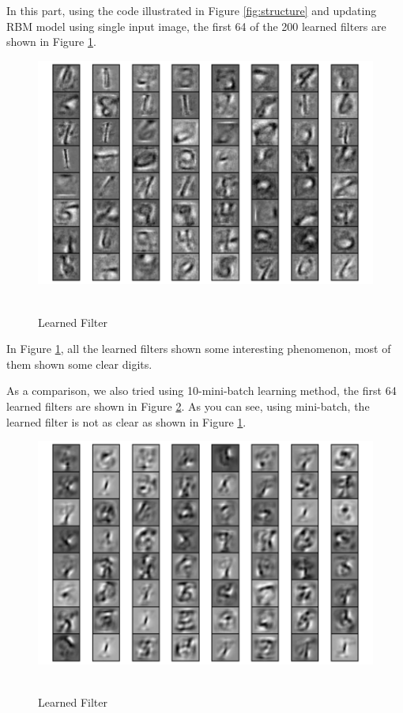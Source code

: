 In this part, using the code illustrated in Figure \ref{fig:structure} and updating RBM model using single input image, the first 64 of the 200 learned filters are shown in Figure \ref{fig:single_filter}.

\begin{figure}[H]
\centering
\includegraphics[width=1.0\textwidth]{./figures/filter.pdf}\
\caption{\label{fig:single_filter} Learned Filter}
\end{figure}

In Figure \ref{fig:single_filter}, all the learned filters shown some interesting phenomenon, most of them shown some clear digits. 

As a comparison, we also tried using 10-mini-batch learning method, the first 64 learned filters are shown in Figure \ref{fig:batch_filter}. As you can see, using mini-batch, the learned filter is not as clear as shown in Figure \ref{fig:single_filter}.

\begin{figure}[H]
\centering
\includegraphics[width=1.0\textwidth]{./figures/filter_batch.pdf}\
\caption{\label{fig:batch_filter} Learned Filter}
\end{figure}

